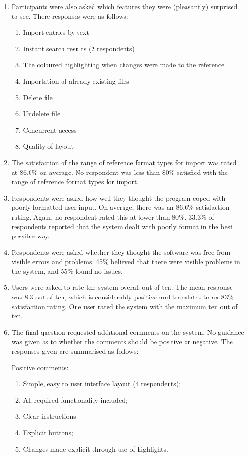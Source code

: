 \begin{enumerate}
	\item Participants were also asked which features they were (pleasantly) surprised to see.  There responses were as follows:
	\begin{enumerate}
		\item Import entries by text
		\item Instant search results (2 respondents)
		\item The coloured highlighting when changes were made to the reference
		\item Importation of already existing \bibtex{} files
		\item Delete file
		\item Undelete file
		\item Concurrent access
		\item Quality of layout
	\end{enumerate}
	
	\item The satisfaction of the range of reference format types for import was rated at 86.6\% on average. No respondent was less than 80\% satisfied with the range of reference format types for import.
	
	\item Respondents were asked how well they thought the program coped with poorly formatted user input. On average, there was an 86.6\% satisfaction rating. Again, no respondent rated this at lower than 80\%. 33.3\% of respondents reported that the system dealt with poorly format in the best possible way.
	
	\item Respondents were asked whether they thought the software was free from visible errors and problems. 45\% believed that there were visible problems in the system, and 55\% found no issues. 
	
	\item Users were asked to rate the system overall out of ten. The mean response was 8.3 out of ten, which is considerably positive and translates to an 83\% satisfaction rating.  One user rated the system with the maximum ten out of ten.
	
	\item The final question requested additional comments on the system.  No guidance was given as to whether the comments should be positive or negative. The responses given are summarised as follows:
	
	Positive comments:
	\begin{enumerate}
		\item Simple, easy to user interface layout (4 respondents);
		\item All required functionality included;
		\item Clear instructions;
		\item Explicit buttons;
		\item Changes made explicit through use of highlights.
	\end{enumerate}
	

\end{enumerate}
